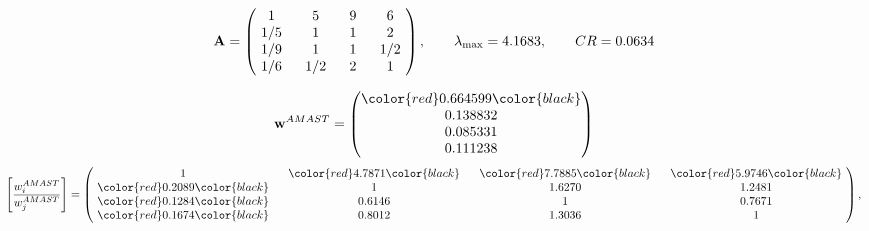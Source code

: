 \begin{example}
\begin{equation*}
\mathbf{A} =
\begin{pmatrix}
$\,\,$ 1 $\,\,$ & $\,\,$5$\,\,$ & $\,\,$9$\,\,$ & $\,\,$6 $\,\,$ \\
$\,\,$ 1/5$\,\,$ & $\,\,$ 1 $\,\,$ & $\,\,$1$\,\,$ & $\,\,$2 $\,\,$ \\
$\,\,$ 1/9$\,\,$ & $\,\,$ 1 $\,\,$ & $\,\,$ 1 $\,\,$ & $\,\,$ 1/2 $\,\,$ \\
$\,\,$ 1/6$\,\,$ & $\,\,$ 1/2$\,\,$ & $\,\,$2$\,\,$ & $\,\,$ 1  $\,\,$ \\
\end{pmatrix},
\qquad
\lambda_{\max} =
4.1683,
\qquad
CR = 0.0634
\end{equation*}

\begin{equation*}
\mathbf{w}^{AMAST} =
\begin{pmatrix}
\color{red} 0.664599\color{black} \\
0.138832\\
0.085331\\
0.111238
\end{pmatrix}\end{equation*}
\begin{equation*}
\left[ \frac{{w}^{AMAST}_i}{{w}^{AMAST}_j} \right] =
\begin{pmatrix}
$\,\,$ 1 $\,\,$ & $\,\,$\color{red} 4.7871\color{black} $\,\,$ & $\,\,$\color{red} 7.7885\color{black} $\,\,$ & $\,\,$\color{red} 5.9746\color{black} $\,\,$ \\
$\,\,$\color{red} 0.2089\color{black} $\,\,$ & $\,\,$ 1 $\,\,$ & $\,\,$1.6270$\,\,$ & $\,\,$1.2481  $\,\,$ \\
$\,\,$\color{red} 0.1284\color{black} $\,\,$ & $\,\,$0.6146$\,\,$ & $\,\,$ 1 $\,\,$ & $\,\,$0.7671 $\,\,$ \\
$\,\,$\color{red} 0.1674\color{black} $\,\,$ & $\,\,$0.8012$\,\,$ & $\,\,$1.3036$\,\,$ & $\,\,$ 1  $\,\,$ \\
\end{pmatrix},
\end{equation*}


\end{example}
